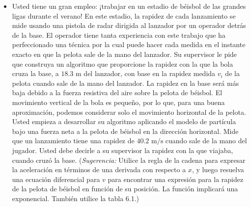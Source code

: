 \documentclass[11pt,a4paper]{article}
\begin{document}
\begin{itemize}
    \item[\textbf{50.}] Usted tiene un gran empleo: ¡trabajar en un estadio de béisbol de las grandes ligas durante el verano! En este estadio, la rapidez de cada lanzamiento se mide usando una pistola de radar dirigida al lanzador por un operador detrás de la base. El operador tiene tanta experiencia con este trabajo que ha perfeccionado una técnica por la cual puede hacer cada medida en el instante exacto en que la pelota sale de la mano del lanzador. Su supervisor le pide que construya un algoritmo que proporcione la rapidez con la que la bola cruza la base, a $18.3 \text{ m}$ del lanzador, con base en la rapidez medida $v_i$ de la pelota cuando sale de la mano del lanzador. La rapidez en la base será más baja debido a la fuerza resistiva del aire sobre la pelota de béisbol. El movimiento vertical de la bola es pequeño, por lo que, para una buena aproximación, podemos considerar solo el movimiento horizontal de la pelota. Usted empieza a desarrollar su algoritmo aplicando el modelo de partícula bajo una fuerza neta a la pelota de béisbol en la dirección horizontal. Mide que un lanzamiento tiene una rapidez de $40.2 \text{ m/s}$ cuando sale de la mano del jugador. Usted debe decirle a su supervisor la rapidez con la que viajaba, cuando cruzó la base. (\textit{Sugerencia:} Utilice la regla de la cadena para expresar la aceleración en términos de una derivada con respecto a $x$, y luego resuelva una ecuación diferencial para $v$ para encontrar una expresión para la rapidez de la pelota de béisbol en función de su posición. La función implicará una exponencial. También utilice la tabla 6.1.)
    \vspace*{8cm}
\end{itemize}
\end{document}
